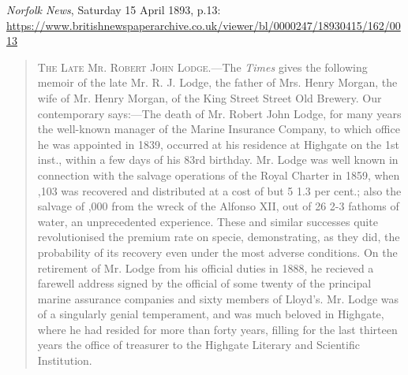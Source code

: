 \emph{Norfolk News}, Saturday 15 April 1893, p.13:
\url{https://www.britishnewspaperarchive.co.uk/viewer/bl/0000247/18930415/162/0013}

\begin{quotation}
\textsc{The Late Mr. Robert John Lodge.}---The \emph{Times} gives the following memoir of the late Mr. R. J. Lodge,
the father of Mrs. Henry Morgan, the wife of Mr. Henry Morgan, of the King Street Street Old Brewery.
Our contemporary says:---The death of Mr. Robert John Lodge, for many years the well-known manager of the Marine
Insurance Company, to which office he was appointed in 1839, occurred at his residence at Highgate on the 1st inst.,
within a few days of his 83rd birthday. Mr. Lodge was well known in connection with the salvage operations of the
Royal Charter in 1859, when ,103 was recovered and distributed at a cost of but 5 1.3 per cent.;
also the salvage of ,000 from the wreck of the Alfonso XII, out of 26 2-3 fathoms of water, an unprecedented
experience. These and similar successes quite revolutionised the premium rate on specie, demonstrating, as they did,
the probability of its recovery even under the most adverse conditions. On the retirement of Mr. Lodge from his
official duties in 1888, he recieved a farewell address signed by the official of some twenty of the principal
marine assurance companies and sixty members of Lloyd's. Mr. Lodge was of a singularly genial temperament, and was
much beloved in Highgate, where he had resided for more than forty years, filling for the last thirteen years the
office of treasurer to the Highgate Literary and Scientific Institution.
\end{quotation}
